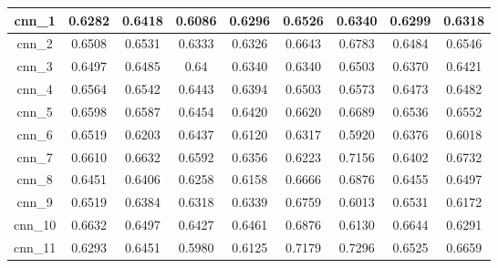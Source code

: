 \begin{table}[p]
\begin{tabular}{|c|c|c|c|c|c|c|c|c|}
        cnn\_1   & 0.6282                        & 0.6418                         & 0.6086                      & 0.6296                  & 0.6526 & 0.6340 & 0.6299 & 0.6318 \\ \hline
        cnn\_2   & 0.6508                        & 0.6531                         & 0.6333                      & 0.6326                  & 0.6643 & 0.6783 & 0.6484 & 0.6546 \\ \hline
        cnn\_3   & 0.6497                        & 0.6485                         & 0.64                        & 0.6340                  & 0.6340 & 0.6503 & 0.6370 & 0.6421 \\ \hline
        cnn\_4   & 0.6564                        & 0.6542                         & 0.6443                      & 0.6394                  & 0.6503 & 0.6573 & 0.6473 & 0.6482 \\ \hline
        cnn\_5   & 0.6598                        & 0.6587                         & 0.6454                      & 0.6420                  & 0.6620 & 0.6689 & 0.6536 & 0.6552 \\ \hline
        cnn\_6   & 0.6519                        & 0.6203                         & 0.6437                      & 0.6120                  & 0.6317 & 0.5920 & 0.6376 & 0.6018 \\ \hline
        cnn\_7   & 0.6610                        & 0.6632                         & 0.6592                      & 0.6356                  & 0.6223 & 0.7156 & 0.6402 & 0.6732 \\ \hline
        cnn\_8   & 0.6451                        & 0.6406                         & 0.6258                      & 0.6158                  & 0.6666 & 0.6876 & 0.6455 & 0.6497 \\ \hline
        cnn\_9   & 0.6519                        & 0.6384                         & 0.6318                      & 0.6339                  & 0.6759 & 0.6013 & 0.6531 & 0.6172 \\ \hline
        cnn\_10  & 0.6632                        & 0.6497                         & 0.6427                      & 0.6461                  & 0.6876 & 0.6130 & 0.6644 & 0.6291 \\ \hline
        cnn\_11  & 0.6293                        & 0.6451                         & 0.5980                      & 0.6125                  & 0.7179 & 0.7296 & 0.6525 & 0.6659 \\ \hline
    \end{tabular}
\end{table}

